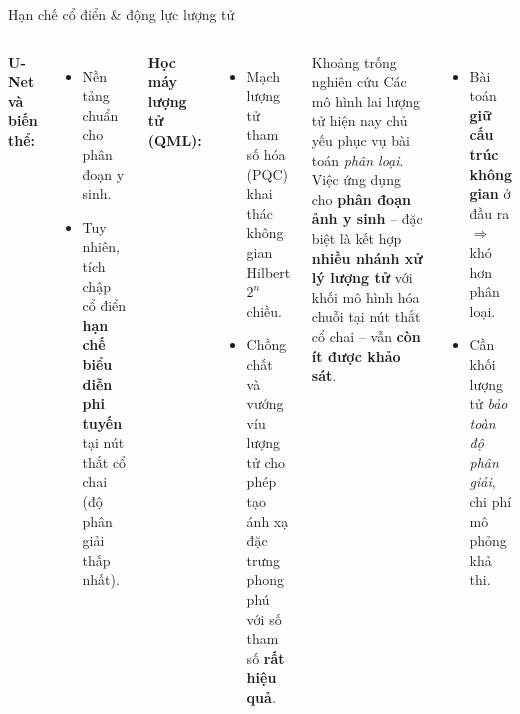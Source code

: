 \documentclass[aspectratio=169,11pt]{beamer}
\newcommand{\hl}[1]{\textcolor{hcmusblue}{\textbf{#1}}}
\newcommand{\acc}[1]{\textcolor{hcmusaccent}{\textbf{#1}}}
\begin{document}
\begin{frame}{Hạn chế cổ điển \& động lực lượng tử}
  \begin{columns}[T]
      \textbf{U-Net và biến thể:}
      \begin{itemize}
        \item Nền tảng chuẩn cho phân đoạn y sinh.
        \item Tuy nhiên, tích chập cổ điển \hl{hạn chế biểu diễn phi tuyến} tại nút thắt cổ chai (độ phân giải thấp nhất).
      \end{itemize}
      \vspace{0.4em}
      \textbf{Học máy lượng tử (QML):}
      \begin{itemize}
        \item Mạch lượng tử tham số hóa (PQC) khai thác không gian Hilbert $2^n$ chiều.
        \item Chồng chất và vướng víu lượng tử cho phép tạo ánh xạ đặc trưng phong phú với số tham số \hl{rất hiệu quả}.
      \end{itemize}
      \begin{block}{Khoảng trống nghiên cứu}
        Các mô hình lai lượng tử hiện nay chủ yếu phục vụ bài toán \emph{phân loại}. Việc ứng dụng cho \hl{phân đoạn ảnh y sinh} -- đặc biệt là kết hợp \hl{nhiều nhánh xử lý lượng tử} với khối mô hình hóa chuỗi tại nút thắt cổ chai -- vẫn \acc{còn ít được khảo sát}.
      \end{block}
      \vspace{0.4em}
      \begin{itemize}
        \item Bài toán \hl{giữ cấu trúc không gian} ở đầu ra $\Rightarrow$ khó hơn phân loại.
        \item Cần khối lượng tử \emph{bảo toàn độ phân giải}, chi phí mô phỏng khả thi.
      \end{itemize}
  \end{columns}
\end{frame}
\end{document}
